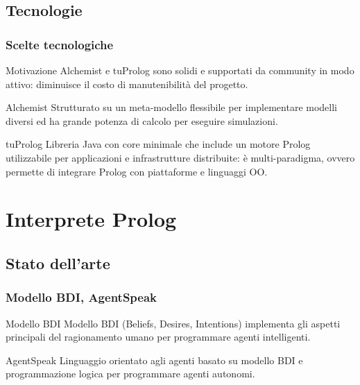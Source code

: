 \documentclass[handout]{beamer}\mode<presentation>{\usetheme{AMSCesenaBleu}}
\begin{document}
\subsection{Tecnologie}
\begin{frame}
\frametitle{Scelte tecnologiche}
\begin{block}{Motivazione}
Alchemist e tuProlog sono solidi e supportati da community in modo attivo: diminuisce il costo di manutenibilità del progetto. 
\end{block}

\begin{block}{Alchemist}
Strutturato su un meta-modello flessibile per implementare modelli diversi ed ha grande potenza di calcolo per eseguire simulazioni.
\end{block}

\begin{block}{tuProlog}
Libreria Java con core minimale che include un motore Prolog utilizzabile per applicazioni e infrastrutture distribuite: è multi-paradigma, ovvero permette di integrare Prolog con piattaforme e linguaggi OO.
\end{block}
\end{frame}



\section{Interprete Prolog}

\subsection{Stato dell'arte}
\begin{frame}
\frametitle{Modello BDI, AgentSpeak}
\begin{block}{Modello BDI}
Modello BDI (Beliefs, Desires, Intentions) implementa gli aspetti principali del ragionamento umano per programmare agenti intelligenti.
\end{block}
\begin{block}{AgentSpeak}
Linguaggio orientato agli agenti basato su modello BDI e programmazione logica per programmare agenti autonomi.
\end{block}
\end{frame}
\end{document}
